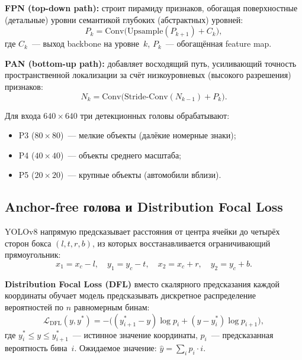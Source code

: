 \documentclass[14pt,a4paper]{report}
\numberwithin{equation}{chapter}
\numberwithin{figure}{chapter}
\numberwithin{table}{chapter}
\begin{document}
\textbf{FPN (top-down path):} строит пирамиду признаков,
обогащая поверхностные (детальные) уровни семантикой
глубоких (абстрактных) уровней:
\begin{equation}
  P_k = \mathrm{Conv}\bigl(\mathrm{Upsample}(P_{k+1}) + C_k\bigr),
\end{equation}
где $C_k$~--- выход backbone на уровне~$k$, $P_k$~--- обогащённая
feature map.

\textbf{PAN (bottom-up path):} добавляет восходящий путь,
усиливающий точность пространственной локализации за счёт
низкоуровневых (высокого разрешения) признаков:
\begin{equation}
  N_k = \mathrm{Conv}\bigl(\mathrm{Stride\text{-}Conv}(N_{k-1}) + P_k\bigr).
\end{equation}

Для входа $640\times640$ три детекционных головы обрабатывают:
\begin{itemize}[nosep]
  \item P3 ($80\times80$)~--- мелкие объекты (далёкие номерные знаки);
  \item P4 ($40\times40$)~--- объекты среднего масштаба;
  \item P5 ($20\times20$)~--- крупные объекты (автомобили вблизи).
\end{itemize}

\subsection{Anchor-free голова и Distribution Focal Loss}

YOLOv8 напрямую предсказывает расстояния от центра ячейки до
четырёх сторон бокса $(l, t, r, b)$, из которых восстанавливается
ограничивающий прямоугольник:
\begin{equation}
  x_1 = x_c - l,\quad y_1 = y_c - t,\quad
  x_2 = x_c + r,\quad y_2 = y_c + b.
\end{equation}

\textbf{Distribution Focal Loss (DFL)} вместо скалярного
предсказания каждой координаты обучает модель предсказывать
дискретное распределение вероятностей по $n$ равномерным бинам:
\begin{equation}
  \mathcal{L}_{\mathrm{DFL}}(y, y^*) =
  -\bigl(
    (y^*_{i+1} - y)\log p_i + (y - y^*_i)\log p_{i+1}
  \bigr),
\end{equation}
где $y^*_i \leq y \leq y^*_{i+1}$~--- истинное значение координаты,
$p_i$~--- предсказанная вероятность бина~$i$.
Ожидаемое значение: $\hat{y} = \sum_i p_i \cdot i$.
\end{document}
